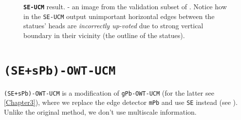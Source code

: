 \begin{figure}[t]
\centering
{}
\caption[{\tt SE-UCM} drawback - ``bleeding'' of strong edges towards unimportant ones]{\textbf{\texttt{SE-UCM}} result. \protect{} - an image from the validation subset of \cite{BSDS500resources}. Notice how in the {\tt SE-UCM} output \protect{} unimportant horizontal edges between the statues' heads are {\it incorrectly %
up-voted} due to strong vertical boundary in their vicinity (the outline of the statues).}
\label{fig:SE-UCM-tikis-bleeding}
\end{figure}

\section{{\tt (SE+sPb)-OWT-UCM}}
\label{sec:ch5-SE_sPb-OWT-UCM}
{\tt (SE+sPb)-OWT-UCM} is a modification of {\tt gPb-OWT-UCM} (for the latter see \cref{Chapter3}), where we replace the edge detector {\tt mPb} and use {\tt SE} instead (see ). Unlike the original method, we don't use multiscale information.

